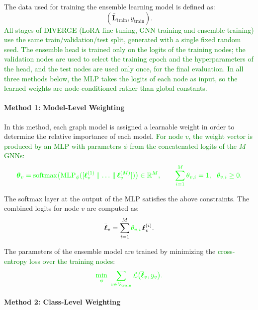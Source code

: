 \documentclass[a4paper,fleqn]{cas-sc}
\newcommand{\revthree}[1]{\textcolor{green}{#1}} %
\begin{document}
The data used for training the ensemble learning model is defined as:
\begin{equation}
(\bar{\mathbf{L}}_{\text{train}}, y_{\text{train}}).
\end{equation}
\revthree{All stages of DIVERGE (LoRA fine-tuning, GNN training and ensemble training) use the same train/validation/test split, generated with a single fixed random seed. The ensemble head is trained only on the logits of the training nodes; the validation nodes are used to select the training epoch and the hyperparameters of the head, and the test nodes are used only once, for the final evaluation. In all three methods below, the MLP takes the logits of each node as input, so the learned weights are node-conditioned rather than global constants.}

\paragraph{Method 1: Model-Level Weighting}

In this method, each graph model is assigned a learnable weight in order to determine the relative importance of each model. \revthree{For node $v$, the weight vector is produced by an MLP with parameters $\phi$ from the concatenated logits of the $M$ GNNs:}
\begin{equation}
\revthree{\boldsymbol{\theta}_v=\mathrm{softmax}\big(\mathrm{MLP}_{\phi}([\boldsymbol{\ell}^{(1)}_{v}\,\|\,\dots\,\|\,\boldsymbol{\ell}^{(M)}_{v}])\big)\in\mathbb{R}^{M}, \qquad \sum_{i=1}^{M}\theta_{v,i}=1,\ \ \theta_{v,i}\ge 0.}
\end{equation}

The softmax layer at the output of the MLP satisfies the above constraints. The combined logits for node $v$ are computed as:
\begin{equation}
\bar{\boldsymbol{\ell}}_{v}=\sum_{i=1}^{M}\revthree{\theta_{v,i}}\,\boldsymbol{\ell}^{(i)}_{v}.
\end{equation}

The parameters of the ensemble model are trained by minimizing the \revthree{cross-entropy loss over the training nodes}:
\begin{equation}
\revthree{\min_{\phi}\ \sum_{v\in\mathcal{V}_{\text{train}}}\mathcal{L}\big(\bar{\boldsymbol{\ell}}_{v},y_v\big).}
\end{equation}

\paragraph{Method 2: Class-Level Weighting}
\end{document}

